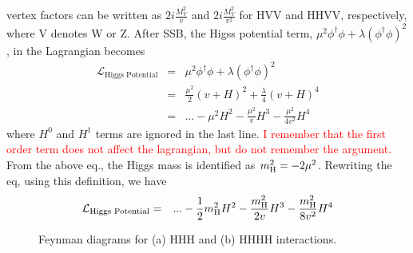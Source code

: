 vertex factors can be written as $\displaystyle 2i \frac {M_V^2}{v}$ 
and $\displaystyle 2i \frac{M_V^2}{v^2}$ for HVV and HHVV, respectively, 
where V denotes W or Z. 
After SSB, the Higss potential term,  
$\mu^2 \phi^\dagger \phi + \lambda \left( \phi^\dagger \phi \right)^2 $,
in the Lagrangian becomes 
\begin{eqnarray} 
\mathcal{L}_{\textrm{Higgs Potential}}
&=&   
\mu^2 \phi^\dagger \phi + \lambda \left( \phi^\dagger \phi \right)^2 \\ 
&=&   
\frac{\mu^2}{2} ( v + H )^2 + \frac{\lambda}{4} ( v + H )^4 \\ 
&=& 
... - \mu^2 H^2 - \frac{\mu^2}{v} H^3  - \frac{\mu^2}{4v^2} H^4 
\end{eqnarray} 
where $H^0$ and $H^1$ terms are ignored in the last line. 
\textcolor{red}{I remember that the first order term does not 
affect the lagrangian, but do not remember the argument.}
From the above eq., the Higgs mass is identified as $m_{\mathrm{H}}^2 =  -2\mu^2$. %
Rewriting the eq, using this definition, we have  
\begin{eqnarray} 
\mathcal{L}_{\textrm{Higgs Potential}}
&=& 
... - \frac{1}{2} m_{\mathrm{H}}^2 H^2 - \frac{m_{\mathrm{H}}^2}{2v} H^3  - \frac{m_{\mathrm{H}}^2}{8v^2} H^4    
\end{eqnarray}

\begin{figure}[htp]
\centering
{}
\hspace{1cm}
\caption{ Feynman diagrams for (a) HHH and (b) HHHH interactions.
}
\label{fig:fd_Hselfterm}
\end{figure}

